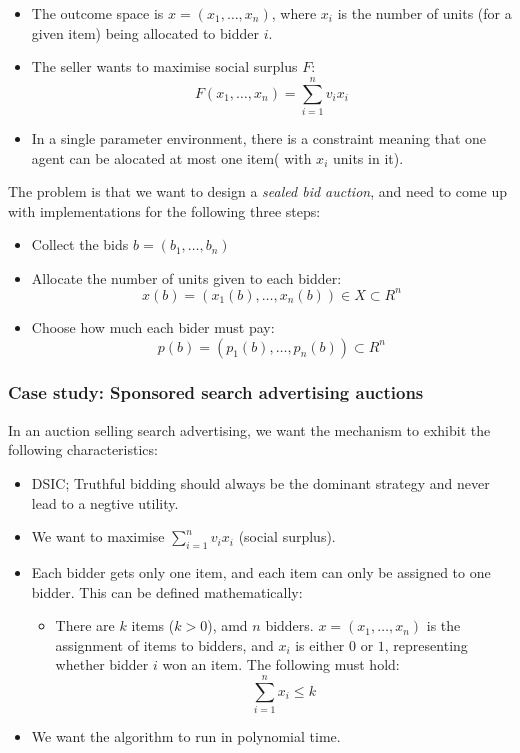 \begin{itemize}
  \item The outcome space is $x = (x_1, \dots, x_n)$, where $x_i$ is the number
  of units (for a given item) being allocated to bidder $i$.
  \item The seller wants to maximise social surplus $F$:
  \[
    F(x_1, \dots, x_n) = \sum\limits^n_{i=1} v_ix_i
  \]
  \item In a single parameter environment, there is a constraint meaning that
  one agent can be alocated at most one item( with $x_i$ units in it).
\end{itemize}

The problem is that we want to design a \textit{sealed bid auction}, and need
to come up with implementations for the following three steps:

\begin{itemize}
  \item Collect the bids $b=(b_1, \dots, b_n)$
  \item Allocate the number of units given to each bidder:
  \[
    x(b) = (x_1(b), \dots, x_n(b)) \in X \subset R^n
  \]
  \item Choose how much each bider must pay:
  \[
    p(b) = (p_1(b), \dots, p_n(b)) \subset R^n
  \]
\end{itemize}

\subsubsection{Case study: Sponsored search advertising auctions}

In an auction selling search advertising, we want the mechanism to exhibit the
following characteristics:

\begin{itemize}
  \item DSIC; Truthful bidding should always be the dominant strategy and never
  lead to a negtive utility.
  \item We want to maximise $\sum^n_{i=1}v_ix_i$ (social surplus).
  \item Each bidder gets only one item, and each item can only be assigned to 
  one bidder. This can be defined mathematically:
  \begin{itemize}
    \item[] There are $k$ items ($k>0$), amd $n$ bidders.
    $x = (x_1, \dots, x_n)$ is the assignment of items to bidders, and $x_i$ is
    either $0$ or $1$, representing whether bidder $i$ won an item. The 
    following must hold:
    \[
      \sum\limits^n_{i=1}x_i \leq k
    \]
  \end{itemize}
  \item We want the algorithm to run in polynomial time.
\end{itemize}

